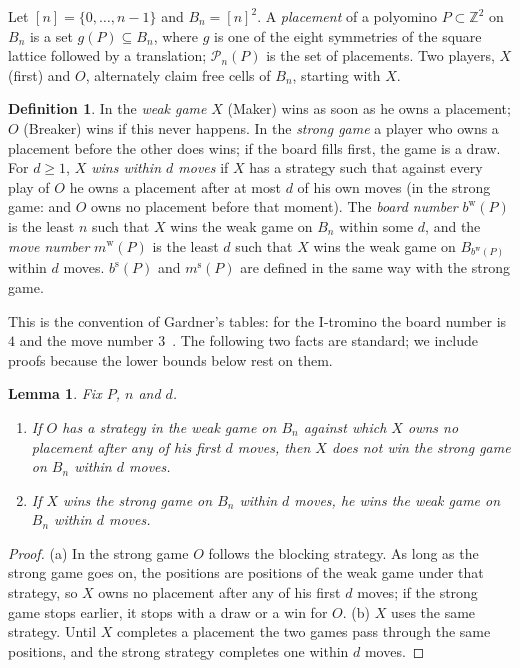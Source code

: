 \documentclass[11pt]{article}
\newtheorem{lemma}[theorem]{Lemma}
\theoremstyle{definition}
\newtheorem{definition}[theorem]{Definition}
\theoremstyle{remark}
\newcommand{\bweak}{b^{\mathrm w}}
\newcommand{\mweak}{m^{\mathrm w}}
\newcommand{\bstr}{b^{\mathrm s}}
\newcommand{\mstr}{m^{\mathrm s}}
\newcommand{\Pl}{\mathcal{P}}
\begin{document}
Let $[n]=\{0,\dots,n-1\}$ and $B_n=[n]^2$. A \emph{placement} of a polyomino $P\subset\mathbb Z^2$
on $B_n$ is a set $g(P)\subseteq B_n$, where $g$ is one of the eight symmetries of the square
lattice followed by a translation; $\Pl_n(P)$ is the set of placements. Two players, $X$ (first)
and $O$, alternately claim free cells of $B_n$, starting with $X$.

\begin{definition}
In the \emph{weak game} $X$ (Maker) wins as soon as he owns a placement; $O$ (Breaker) wins if this
never happens. In the \emph{strong game} a player who owns a placement before the other does wins;
if the board fills first, the game is a draw. For $d\ge 1$, \emph{$X$ wins within $d$ moves} if $X$
has a strategy such that against every play of $O$ he owns a placement after at most $d$ of his own
moves (in the strong game: and $O$ owns no placement before that moment). The \emph{board number}
$\bweak(P)$ is the least $n$ such that $X$ wins the weak game on $B_n$ within some $d$, and the
\emph{move number} $\mweak(P)$ is the least $d$ such that $X$ wins the weak game on $B_{\bweak(P)}$ within
$d$ moves. $\bstr(P)$ and $\mstr(P)$ are defined in the same way with the strong game.
\end{definition}

This is the convention of Gardner's tables: for the I-tromino the board number is $4$ and the move
number $3$~\cite[p.~494]{Gar01}. The following two facts are standard; we include proofs because
the lower bounds below rest on them.

\begin{lemma}\label{lem:weakstrong}
Fix $P$, $n$ and $d$.
\begin{enumerate}
\item[(a)] If $O$ has a strategy in the weak game on $B_n$ against which $X$ owns no placement after
any of his first $d$ moves, then $X$ does not win the strong game on $B_n$ within $d$ moves.
\item[(b)] If $X$ wins the strong game on $B_n$ within $d$ moves, he wins the weak game on $B_n$
within $d$ moves.
\end{enumerate}
\end{lemma}

\begin{proof}
(a) In the strong game $O$ follows the blocking strategy. As long as the strong game goes on, the
positions are positions of the weak game under that strategy, so $X$ owns no placement after any of
his first $d$ moves; if the strong game stops earlier, it stops with a draw or a win for $O$.
(b) $X$ uses the same strategy. Until $X$ completes a placement the two games pass through the same
positions, and the strong strategy completes one within $d$ moves.
\end{proof}
\end{document}
